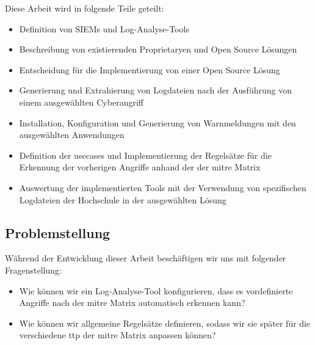 Diese Arbeit wird in folgende Teile geteilt: 





{
\begin{itemize}[noitemsep]
   \item	Definition von SIEMs und Log-Analyse-Tools 
   \item	Beschreibung von existierenden \gls{Proprietary}en und Open Source Lösungen
   \item	Entscheidung für die Implementierung von einer Open Source Lösung
   \item Generierung und Extrahierung von Logdateien nach der Ausführung von einem ausgewählten \gls{Cyberangriff} 
   \item	Installation, Konfiguration und Generierung von Warnmeldungen mit den ausgewählten Anwendungen 
   \item	Definition der \gls{usecases} und Implementierung der Regelsätze für die Erkennung der vorherigen Angriffe anhand der  der \gls{mitre} Matrix 
   \item	Auswertung der implementierten Tools mit der Verwendung von  spezifischen Logdateien der Hochschule in der ausgewählten Lösung
\end{itemize}
}

\subsection{Problemstellung}
Während der Entwicklung dieser Arbeit beschäftigen wir uns mit folgender Fragenstellung: 

{
\begin{itemize}[noitemsep]
   \item Wie können wir ein Log-Analyse-Tool konfigurieren, dass es vordefinierte Angriffe nach der \gls{mitre} Matrix automatisch erkennen kann? 
   \item Wie können wir allgemeine Regelsätze definieren, sodass wir sie später für die verschiedene \gls{ttp} der \gls{mitre} Matrix anpassen können?
\end{itemize}
}

